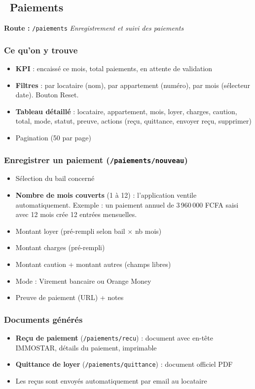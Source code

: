 \documentclass[12pt,a4paper]{article}
\begin{document}
\subsection{\faMoneyBill\ Paiements}
\textbf{Route :} \texttt{/paiements} \hfill \textit{Enregistrement et suivi des paiements}

\subsubsection{Ce qu'on y trouve}
\begin{itemize}
\item \textbf{KPI} : encaiss\'e ce mois, total paiements, en attente de validation
\item \textbf{Filtres} : par locataire (nom), par appartement (num\'ero), par mois (s\'electeur date). Bouton Reset.
\item \textbf{Tableau d\'etaill\'e} : locataire, appartement, mois, loyer, charges, caution, total, mode, statut, preuve, actions (re\c{c}u, quittance, envoyer re\c{c}u, supprimer)
\item Pagination (50 par page)
\end{itemize}

\subsubsection{Enregistrer un paiement (\texttt{/paiements/nouveau})}
\begin{itemize}
\item S\'election du bail concern\'e
\item \textbf{Nombre de mois couverts} (1 \`a 12) : l'application ventile automatiquement. Exemple : un paiement annuel de 3\,960\,000 FCFA saisi avec 12 mois cr\'ee 12 entr\'ees mensuelles.
\item Montant loyer (pr\'e-rempli selon bail $\times$ nb mois)
\item Montant charges (pr\'e-rempli)
\item Montant caution + montant autres (champs libres)
\item Mode : Virement bancaire ou Orange Money
\item Preuve de paiement (URL) + notes
\end{itemize}

\subsubsection{Documents g\'en\'er\'es}
\begin{itemize}
\item \textbf{Re\c{c}u de paiement} (\texttt{/paiements/recu}) : document avec en-t\^ete IMMOSTAR, d\'etails du paiement, imprimable
\item \textbf{Quittance de loyer} (\texttt{/paiements/quittance}) : document officiel PDF
\item Les re\c{c}us sont envoy\'es automatiquement par email au locataire
\end{itemize}
\end{document}

